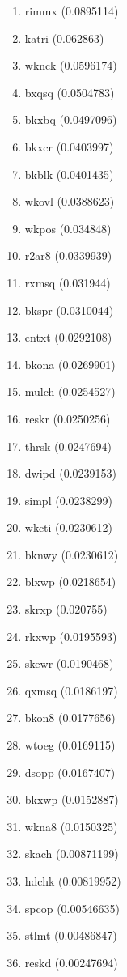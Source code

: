 \begin{enumerate}
\item rimmx (0.0895114)
\item katri (0.062863)
\item wknck (0.0596174)
\item bxqsq (0.0504783)
\item bkxbq (0.0497096)
\item bkxcr (0.0403997)
\item bkblk (0.0401435)
\item wkovl (0.0388623)
\item wkpos (0.034848)
\item r2ar8 (0.0339939)
\item rxmsq (0.031944)
\item bkspr (0.0310044)
\item cntxt (0.0292108)
\item bkona (0.0269901)
\item mulch (0.0254527)
\item reskr (0.0250256)
\item thrsk (0.0247694)
\item dwipd (0.0239153)
\item simpl (0.0238299)
\item wkcti (0.0230612)
\item bknwy (0.0230612)
\item blxwp (0.0218654)
\item skrxp (0.020755)
\item rkxwp (0.0195593)
\item skewr (0.0190468)
\item qxmsq (0.0186197)
\item bkon8 (0.0177656)
\item wtoeg (0.0169115)
\item dsopp (0.0167407)
\item bkxwp (0.0152887)
\item wkna8 (0.0150325)
\item skach (0.00871199)
\item hdchk (0.00819952)
\item spcop (0.00546635)
\item stlmt (0.00486847)
\item reskd (0.00247694)
\end{enumerate}